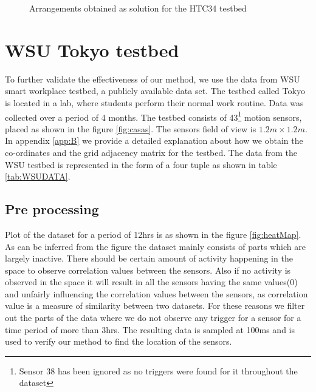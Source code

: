 \begin{figure}[!ht]
\caption{Arrangements obtained as solution for the HTC34 testbed}
\label{fig:arrangement4x2}
\centering
\end{figure}


\section{WSU Tokyo testbed}
To further validate the effectiveness of our method, we use the data from WSU smart workplace testbed\cite{cook2010detection}, a publicly available data set. The testbed called Tokyo is located in a lab,  where students perform their normal work routine. Data was collected over a period of 4 months. 
The testbed consists of 43\footnote{Sensor 38 has been ignored as no triggers were found for it throughout the dataset} motion sensors, placed as shown in the figure \ref{fig:casas}. The sensors field of view is $1.2m \times 1.2m$. In appendix \ref{app:B} we provide a detailed explanation about how we obtain the co-ordinates and the grid adjacency matrix for the testbed. The data from the WSU testbed is represented in the form of a four tuple as shown in table \ref{tab:WSUDATA}. 
\subsection{Pre processing}
Plot of the dataset for a period of 12hrs is as shown in the figure \ref{fig:heatMap}. As can be inferred from the figure the dataset mainly consists of parts which are largely inactive. There should be certain amount of activity happening in the space to observe correlation values between the sensors.  Also if  no activity is observed in the space it will result in all the sensors having the same values(0) and unfairly influencing the correlation values between the sensors, as correlation value is a measure of similarity between two datasets. For these reasons we filter out the parts of the data where we do not observe any trigger for a sensor for a time period of more than 3hrs. The resulting data is sampled at 100ms and is used to verify our method to find the location of the sensors.



